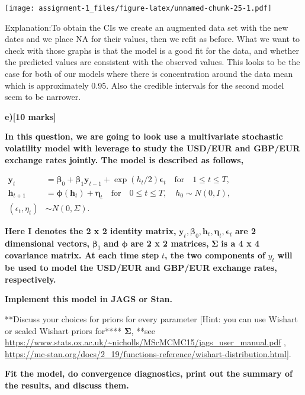 \documentclass[
]{article}
\begin{document}
\texttt{[image: assignment-1\_files/figure-latex/unnamed-chunk-25-1.pdf]}

Explanation:To obtain the CIs we create an augmented data set with the
new dates and we place NA for their values, then we refit as before.
What we want to check with those graphs is that the model is a good fit
for the data, and whether the predicted values are consistent with the
observed values. This looks to be the case for both of our models where
there is concentration around the data mean which is approximately 0.95.
Also the credible intervals for the second model seem to be narrower.

\textbf{e){[}10 marks{]}}

\textbf{In this question, we are going to look use a multivariate
stochastic volatility model with leverage to study the USD/EUR and
GBP/EUR exchange rates jointly. The model is described as follows,}

\(\begin{aligned}\boldsymbol{y}_t&=\boldsymbol{\beta}_0+\boldsymbol{\beta}_1 \boldsymbol{y}_{t-1}+\exp(h_t/2)\boldsymbol{\epsilon}_t \quad \text{for}\quad 1\le t\le T,\\ \boldsymbol{h}_{t+1}&=\boldsymbol{\phi}(\boldsymbol{h}_t)+\boldsymbol{\eta}_t\quad \text{for} \quad 0\le t\le T, \quad h_0\sim N(0, I),\\ (\epsilon_t,\eta_t)&\sim N\left(0, \Sigma\right).\end{aligned}\)

\textbf{Here I denotes the 2 x 2 identity matrix,}
\(\boldsymbol{y}_t, \boldsymbol{\beta}_0, \boldsymbol{h}_t, \boldsymbol{\eta}_t, \boldsymbol{\epsilon}_t\)
\textbf{are 2 dimensional vectors,} \(\boldsymbol{\beta}_1\)
\textbf{and} \(\boldsymbol{\phi}\) \textbf{are 2 x 2 matrices,}
\(\boldsymbol{\Sigma}\) \textbf{is a 4 x 4 covariance matrix. At each
time step} \(t\)\textbf{, the two components of} \(y_t\) \textbf{will be
used to model the USD/EUR and GBP/EUR exchange rates, respectively.}

\textbf{Implement this model in JAGS or Stan.}

**Discuss your choices for priors for every parameter {[}Hint: you can
use Wishart or scaled Wishart priors for**** \(\boldsymbol{\Sigma}\),
**see
\url{https://www.stats.ox.ac.uk/~nicholls/MScMCMC15/jags_user_manual.pdf}
,
\url{https://mc-stan.org/docs/2_19/functions-reference/wishart-distribution.html}{]}.

\textbf{Fit the model, do convergence diagnostics, print out the summary
of the results, and discuss them.}
\end{document}
